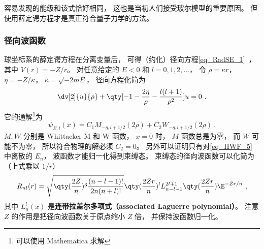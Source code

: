 容易发现的能级和该式恰好相同， 这也是当初人们接受玻尔模型的重要原因。 但使用薛定谔方程才是真正符合量子力学的方法。

\subsubsection{径向波函数}
球坐标系的薛定谔方程在分离变量后， 可得（约化）径向方程\autoref{eq_RadSE_1}~， 其中 $V(r) = -Z/r$。 对任意给定的 $E < 0$ 和 $l = 0,1,2,\dots$， 令 $\rho = \kappa r$， $\eta = -Z/\kappa$， $\kappa = \sqrt{-2mE}$， 径向方程化简为
\begin{equation}\label{eq_HWF_11}
\dv[2]{u}{\rho} + \qty[-1 - \frac{2\eta}{\rho} - \frac{l(l+1)}{\rho^2}]u = 0~.
\end{equation}
它的通解\footnote{可以使用 Mathematica 求解}为
\begin{equation}\label{eq_HWF_6}
\psi_{E,l}(x) = C_1 M_{-\eta, l+1/2}(2 \rho) + C_2 W_{-\eta, l+1/2}(2 \rho)~.
\end{equation}
$M, W$ 分别是 Whittacker M 和 W 函数， $x = 0$ 时， $M$ 函数总是为零， 而 $W$ 可能不为零， 所以符合物理的解必须 $C_2 = 0$。 另外可以证明只有对\autoref{eq_HWF_5} 中离散的 $E_n$， 波函数才能归一化得到束缚态。 束缚态的径向波函数可以化简为（上式乘以 $1/r$）
\begin{equation}\label{eq_HWF_2}
R_{nl}(r) = \sqrt{\qty(\frac{2 Z}{n})^3 \frac{(n - l - 1)!}{2n (n + l)!}} \qty(\frac{2Zr}{n})^l  L_{n-l-1}^{2l+1}\qty(\frac{2Zr}{n}) \E^{-Zr/n}~,
\end{equation}
其中 $L_n^l(x)$ 是\textbf{连带拉盖尔多项式（associated Laguerre polynomial）}。 注意 $Z$ 的作用是把径向波函数关于原点缩小 $Z$ 倍， 并保持波函数归一化。

